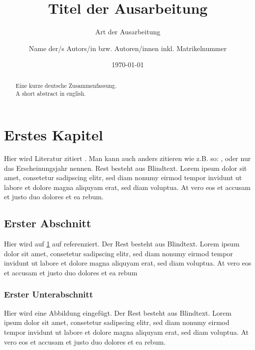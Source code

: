 \documentclass[BCOR=1cm, twoside, ngerman]{scrreprt}
\title{Titel der Ausarbeitung}
\subtitle{Art der Ausarbeitung}
\author{Name der/s Autors/in bzw. Autoren/innen inkl. Matrikelnummer}
\date{\today} %
\begin{document}
\maketitle

\begin{abstract}
Eine kurze deutsche Zusammenfassung.\\

A short abstract in english.
\end{abstract}

\tableofcontents

\chapter{Erstes Kapitel}
\label{chp:kapitel1} %
Hier wird Literatur zitiert \cite{lion2010}. Man kann auch anders zitieren wie z.B. so: \textcite{wombat2016}, oder nur das Erscheinungsjahr \citeyear{wikibook} nennen. Rest besteht aus Blindtext. Lorem ipsum dolor sit amet, consetetur sadipscing elitr, sed diam nonumy eirmod tempor invidunt ut labore et dolore magna aliquyam erat, sed diam voluptua. At vero eos et accusam et justo duo dolores et ea rebum.

\section{Erster Abschnitt}
\label{sec:abschnitt1} %
Hier wird auf \cref{chp:kapitel1} auf  referenziert. Der Rest besteht aus Blindtext. Lorem ipsum dolor sit amet, consetetur sadipscing elitr, sed diam nonumy eirmod tempor invidunt ut labore et dolore magna aliquyam erat, sed diam voluptua. At vero eos et accusam et justo duo dolores et ea rebum

\subsection{Erster Unterabschnitt}
\label{subsec:unterabschnitt1} %
Hier wird eine Abbildung eingefügt. Der Rest besteht aus Blindtext. Lorem ipsum dolor sit amet, consetetur sadipscing elitr, sed diam nonumy eirmod tempor invidunt ut labore et dolore magna aliquyam erat, sed diam voluptua. At vero eos et accusam et justo duo dolores et ea rebum.
\end{document}
